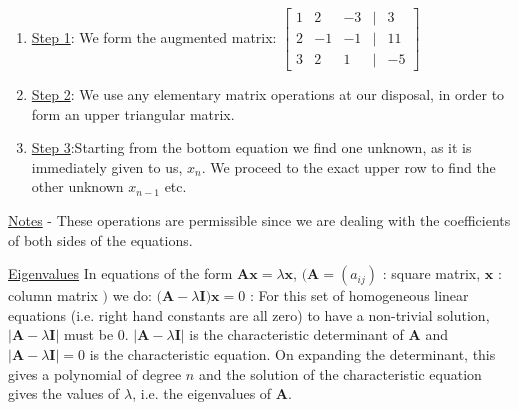 \documentclass[12pt]{article}
\begin{document}
\begin{flushleft}
	\begin{enumerate}
	\item \uline{Step 1}: We form the augmented matrix: $
	\begin{bmatrix}
	1 & 2 & -3 & | & 3 \\ 
	2 & -1 & -1 & | & 11 \\ 
	3 & 2 & 1 & | & -5
	\end{bmatrix} $
	\item \uline{Step 2}: We use any elementary matrix operations at our disposal, in order to form an upper triangular matrix.
	\item \uline{Step 3}:Starting from the bottom equation we find one unknown, as it is immediately given to us, $x_n$. We proceed to the exact upper row to find the other unknown $x_{n-1}$ etc.
	\end{enumerate}
	\uline{Notes} \linebreak 
	\quad - These operations are permissible since we are dealing with the coefficients of both sides of the equations. \linebreak 
	
	\textbullet \quad \uline{Eigenvalues} \linebreak 
	In equations of the form $ \textbf{A} \textbf{x} = \lambda \textbf{x} $, $\big( \textbf{A} = (a_{ij}) $  :  square matrix, $\textbf{x}$  :  column matrix $\big)$ we do: $\big( \textbf{A} - \lambda \textbf{I} \big) \textbf{x} = 0 $  :  For this set of homogeneous linear equations (i.e. right hand constants are all zero) to have a non-trivial solution, $\left| \textbf{A} - \lambda \textbf{I} \right| $ must be $0$. $\left| \textbf{A} - \lambda \textbf{I} \right| $ is the characteristic determinant of $\textbf{A}$ and $\left| \textbf{A} - \lambda \textbf{I} \right| = 0$ is the characteristic equation. On expanding the determinant, this gives a polynomial of degree $n$ and the solution of the characteristic equation gives the values of $\lambda$, i.e. the eigenvalues of $\textbf{A}$. \linebreak 
	

\end{flushleft}
\end{document}
